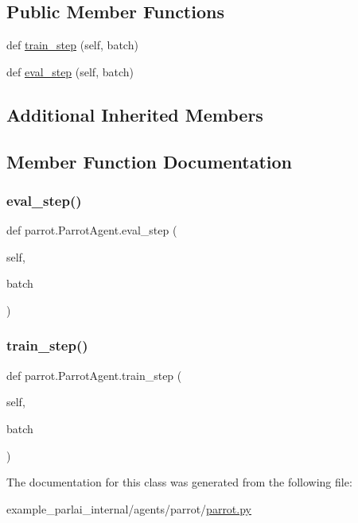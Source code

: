 \subsection*{Public Member Functions}
\begin{DoxyCompactItemize}
\item 
def \hyperlink{classparrot_1_1ParrotAgent_a85446c6c7698b050d80a2324495c9321}{train\+\_\+step} (self, batch)
\item 
def \hyperlink{classparrot_1_1ParrotAgent_a210ad5eb90ce7add4a2b2cb641c4de3c}{eval\+\_\+step} (self, batch)
\end{DoxyCompactItemize}
\subsection*{Additional Inherited Members}


\subsection{Member Function Documentation}
\mbox{\label{classparrot_1_1ParrotAgent_a210ad5eb90ce7add4a2b2cb641c4de3c}} 
\subsubsection{\texorpdfstring{eval\+\_\+step()}{eval\_step()}}
{\footnotesize\ttfamily def parrot.\+Parrot\+Agent.\+eval\+\_\+step (\begin{DoxyParamCaption}\item[{}]{self,  }\item[{}]{batch }\end{DoxyParamCaption})}

\mbox{\label{classparrot_1_1ParrotAgent_a85446c6c7698b050d80a2324495c9321}} 
\subsubsection{\texorpdfstring{train\+\_\+step()}{train\_step()}}
{\footnotesize\ttfamily def parrot.\+Parrot\+Agent.\+train\+\_\+step (\begin{DoxyParamCaption}\item[{}]{self,  }\item[{}]{batch }\end{DoxyParamCaption})}



The documentation for this class was generated from the following file\+:\begin{DoxyCompactItemize}
\item 
example\+\_\+parlai\+\_\+internal/agents/parrot/\hyperlink{parrot_8py}{parrot.\+py}\end{DoxyCompactItemize}
